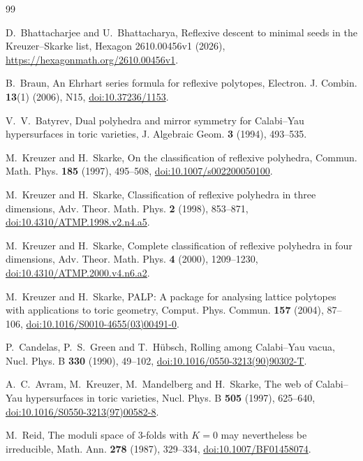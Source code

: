 \documentclass[manuscript]{aomart}
\theoremstyle{definition}
\theoremstyle{remark}
\begin{document}
\FloatBarrier
\begingroup\raggedright
\begin{thebibliography}{99}

D.~Bhattacharjee and U.~Bhattacharya, Reflexive descent to minimal seeds
in the Kreuzer--Skarke list, Hexagon 2610.00456v1 (2026),
\url{https://hexagonmath.org/2610.00456v1}.

B.~Braun, An Ehrhart series formula for reflexive polytopes,
Electron. J. Combin. \textbf{13}(1) (2006), N15,
\href{https://doi.org/10.37236/1153}{doi:10.37236/1153}.

V.~V.~Batyrev, Dual polyhedra and mirror symmetry for Calabi--Yau
hypersurfaces in toric varieties, J. Algebraic Geom. \textbf{3} (1994), 493--535.

M.~Kreuzer and H.~Skarke, On the classification of reflexive polyhedra,
Commun. Math. Phys. \textbf{185} (1997), 495--508,
\href{https://doi.org/10.1007/s002200050100}{doi:10.1007/s002200050100}.

M.~Kreuzer and H.~Skarke, Classification of reflexive polyhedra in three
dimensions, Adv. Theor. Math. Phys. \textbf{2} (1998), 853--871,
\href{https://doi.org/10.4310/ATMP.1998.v2.n4.a5}{doi:10.4310/ATMP.1998.v2.n4.a5}.

M.~Kreuzer and H.~Skarke, Complete classification of reflexive polyhedra
in four dimensions, Adv. Theor. Math. Phys. \textbf{4} (2000), 1209--1230,
\href{https://doi.org/10.4310/ATMP.2000.v4.n6.a2}{doi:10.4310/ATMP.2000.v4.n6.a2}.

M.~Kreuzer and H.~Skarke, PALP: A package for analysing lattice polytopes
with applications to toric geometry, Comput. Phys. Commun. \textbf{157} (2004), 87--106,
\href{https://doi.org/10.1016/S0010-4655(03)00491-0}{doi:10.1016/S0010-4655(03)00491-0}.

P.~Candelas, P.~S.~Green and T.~H\"ubsch, Rolling among Calabi--Yau
vacua, Nucl. Phys. B \textbf{330} (1990), 49--102,
\href{https://doi.org/10.1016/0550-3213(90)90302-T}{doi:10.1016/0550-3213(90)90302-T}.

A.~C.~Avram, M.~Kreuzer, M.~Mandelberg and H.~Skarke, The web of
Calabi--Yau hypersurfaces in toric varieties, Nucl. Phys. B \textbf{505} (1997), 625--640,
\href{https://doi.org/10.1016/S0550-3213(97)00582-8}{doi:10.1016/S0550-3213(97)00582-8}.

M.~Reid, The moduli space of 3-folds with $K=0$ may nevertheless be
irreducible, Math. Ann. \textbf{278} (1987), 329--334,
\href{https://doi.org/10.1007/BF01458074}{doi:10.1007/BF01458074}.


\end{thebibliography}
\end{document}
